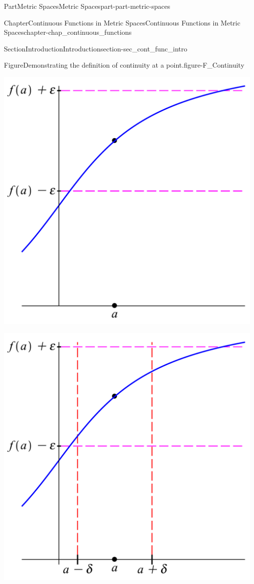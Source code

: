 \documentclass[oneside,10pt,]{book}
\numberwithin{equation}{chapter}
\begin{document}
\begin{partptx}{Part}{Metric Spaces}{}{Metric Spaces}{}{}{part-part-metric-spaces}
\begin{chapterptx}{Chapter}{Continuous Functions in Metric Spaces}{}{Continuous Functions in Metric Spaces}{}{}{chapter-chap_continuous_functions}
\begin{sectionptx}{Section}{Introduction}{}{Introduction}{}{}{section-sec_cont_func_intro}
\begin{figureptx}{Figure}{Demonstrating the definition of continuity at a point.}{figure-F_Continuity}{}
\begin{sidebyside}{2}{0}{0}{0}
\begin{sbspanel}{0.5}
\includegraphics[width=\linewidth]{external/Continuity_1.pdf}
\end{sbspanel}%
\begin{sbspanel}{0.5}%
\includegraphics[width=\linewidth]{external/Continuity_2.pdf}

\end{sbspanel}
\end{sidebyside}
\end{figureptx}
\end{sectionptx}
\end{chapterptx}
\end{partptx}
\end{document}
